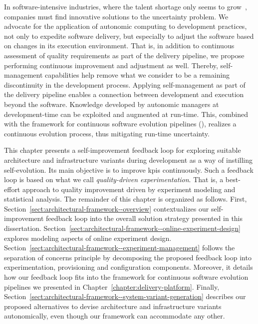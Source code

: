 In software-intensive industries, where the talent shortage only seems to grow~\cite{radant-2014-analysis,breaux-2021-software}, companies must find innovative solutions to the uncertainty problem. We advocate for the application of autonomic computing to development practices, not only to expedite software delivery, but especially to adjust the software based on changes in its execution environment. That is, in addition to continuous assessment of quality requirements as part of the delivery pipeline, we propose performing continuous improvement and adjustment as well. Thereby, self-management capabilities help remove what we consider to be a remaining discontinuity in the development process. Applying self-management as part of the delivery pipeline enables a connection between development and execution beyond the software. Knowledge developed by autonomic managers at development-time can be exploited and augmented at run-time. This, combined with the framework for continuous software evolution pipelines (), realizes a continuous evolution process, thus mitigating run-time uncertainty.

This chapter presents a self-improvement feedback loop for exploring suitable architecture and infrastructure variants during development as a way of instilling self-evolution. Its main objective is to improve \glspl{kpi} continuously. Such a feedback loop is based on what we call \emph{quality-driven experimentation}. That is, a best-effort approach to quality improvement driven by experiment modeling and statistical analysis. The remainder of this chapter is organized as follows. First, Section~\ref{sect:architectural-framework--overview} contextualizes our self-improvement feedback loop into the overall solution strategy presented in this dissertation. Section~\ref{sect:architectural-framework--online-experiment-design} explores modeling aspects of online experiment design. Section~\ref{sect:architectural-framework--experiment-management} follows the separation of concerns principle by decomposing the proposed feedback loop into experimentation, provisioning and configuration components. Moreover, it details how our feedback loop fits into the framework for continuous software evolution pipelines we presented in Chapter~\ref{chapter:delivery-platform}. Finally, Section~\ref{sect:architectural-framework--system-variant-generation} describes our proposed alternatives to devise architecture and infrastructure variants autonomically, even though our framework can accommodate any other.

